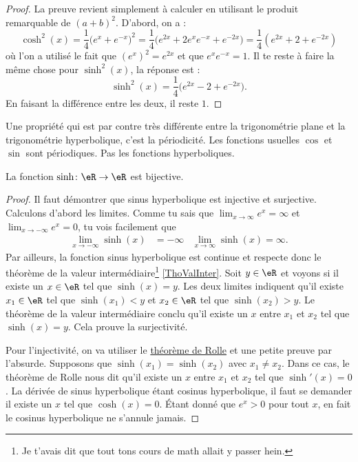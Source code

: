\begin{proof}
La preuve revient simplement à calculer en utilisant le produit remarquable de $(a+b)^2$. D'abord, on a :
\[ 
  \cosh^2(x)=\frac{1}{ 4 }\big(  e^{x}+ e^{-x} \big)^2=\frac{1}{ 4 }\big(  e^{2x}+2 e^{x} e^{-x}+ e^{-2x} \big)=\frac{1}{ 4 }( e^{2x}+2+ e^{-2x})
\]
où l'on a utilisé le fait que $(e^{x})^2= e^{2x}$ et que $ e^{x} e^{-x}=1$. Il te reste à faire la même chose pour $\sinh^2(x)$, la réponse est :
\[ 
  \sinh^2(x)=\frac{1}{ 4 }\big(  e^{2x}-2+ e^{-2x} \big).
\]
En faisant la différence entre les deux, il reste $1$.
\end{proof}
Une propriété qui est par contre très différente entre la trigonométrie plane et la trigonométrie hyperbolique, c'est la périodicité. Les fonctions usuelles $\cos$ et $\sin$ sont périodiques. Pas les fonctions hyperboliques.

\begin{proposition}
La fonction $\sinh\colon \eR\to\eR $ est bijective.
\end{proposition}

\begin{proof}
Il faut démontrer que sinus hyperbolique est injective et surjective. Calculons d'abord les limites. Comme tu sais que $\lim_{x\to\infty} e^{x}=\infty$ et $\lim_{x\to-\infty} e^{x}=0$, tu vois facilement que
\begin{align}
\lim_{x\to-\infty}\sinh(x)&=-\infty	&\lim_{x\to\infty}\sinh(x)=\infty.
\end{align}
Par ailleurs, la fonction sinus hyperbolique est continue et respecte donc le théorème de la valeur intermédiaire\footnote{Je t'avais dit que tout tons cours de math allait y passer hein.} \ref{ThoValInter}. Soit $y\in\eR$ et voyons si il existe un $x\in\eR$ tel que $\sinh(x)=y$. Les deux limites indiquent qu'il existe $x_1\in\eR$ tel que $\sinh(x_1)<y$ et $x_2\in\eR$ tel que $\sinh(x_2)>y$. Le théorème de la valeur intermédiaire conclu qu'il existe un $x$ entre $x_1$ et $x_2$ tel que $\sinh(x)=y$. Cela prouve la surjectivité.

Pour l'injectivité, on va utiliser le \href{http://fr.wikipedia.org/wiki/Théorème_de_Rolle}{théorème de Rolle} et une petite preuve par l'absurde. Supposons que $\sinh(x_1)=\sinh(x_2)$ avec $x_1\neq x_2$. Dans ce cas, le théorème de Rolle nous dit qu'il existe un $x$ entre $x_1$ et $x_2$ tel que $\sinh'(x)=0$. La dérivée de sinus hyperbolique étant cosinus hyperbolique, il faut se demander il existe un $x$ tel que $\cosh(x)=0$. Étant donné que $ e^{x}>0$ pour tout $x$, en fait le cosinus hyperbolique ne s'annule jamais.

\end{proof}

